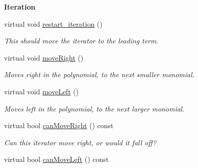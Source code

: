 \begin{Indent}\textbf{ Iteration}\par
\begin{DoxyCompactItemize}
\item 
\mbox{\label{class_geobucket___iterator_aff0aac3cfbbd04463dca544ee01044b7}} 
virtual void \hyperlink{class_geobucket___iterator_aff0aac3cfbbd04463dca544ee01044b7}{restart\+\_\+iteration} ()
\begin{DoxyCompactList}\small\item\em This should move the iterator to the leading term. \end{DoxyCompactList}\item 
\mbox{\label{class_geobucket___iterator_a938e11814077e4ea017e56f1d669ce09}} 
virtual void \hyperlink{class_geobucket___iterator_a938e11814077e4ea017e56f1d669ce09}{move\+Right} ()
\begin{DoxyCompactList}\small\item\em Moves right in the polynomial, to the next smaller monomial. \end{DoxyCompactList}\item 
\mbox{\label{class_geobucket___iterator_a4514572004e314ad8f85a4e59df67a79}} 
virtual void \hyperlink{class_geobucket___iterator_a4514572004e314ad8f85a4e59df67a79}{move\+Left} ()
\begin{DoxyCompactList}\small\item\em Moves left in the polynomial, to the next larger monomial. \end{DoxyCompactList}\item 
\mbox{\label{class_geobucket___iterator_a401e923a3296905653159246715695ad}} 
virtual bool \hyperlink{class_geobucket___iterator_a401e923a3296905653159246715695ad}{can\+Move\+Right} () const
\begin{DoxyCompactList}\small\item\em Can this iterator move right, or would it fall off? \end{DoxyCompactList}\item 
\mbox{\label{class_geobucket___iterator_a3b261590c1478e548791f3695003d093}} 
virtual bool \hyperlink{class_geobucket___iterator_a3b261590c1478e548791f3695003d093}{can\+Move\+Left} () const

\end{DoxyCompactItemize}
\end{Indent}
